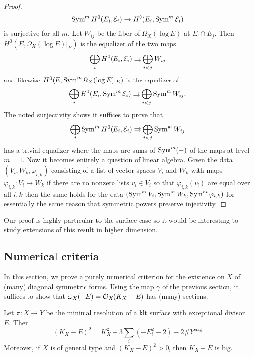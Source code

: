 \documentclass[main.tex]{subfiles}
\begin{document}
\begin{proof}
\[ \operatorname{\mathrm{Sym}}^m H^0(E_i, \mathcal{E}_i) \to H^0(E_i, \operatorname{\mathrm{Sym}}^m \mathcal{E}_i) \]
is surjective for all $m$. Let $W_{ij}$ be the fiber of $\Omega_X(\log{E})$ at $E_i \cap E_j$. Then $H^0(E, \Omega_X(\log{E})|_E)$ is the equalizer of the two maps
\[ \bigoplus_{i} H^0(E_i, \mathcal{E}_i) \rightrightarrows \bigoplus_{i < j} W_{ij} \]
and likewise $H^0(E, \operatorname{\mathrm{Sym}}^m \Omega_X(\log{E})|_E)$ is the equalizer of 
\[ \bigoplus_{i} H^0(E_i, \operatorname{\mathrm{Sym}}^m \mathcal{E}_i) \rightrightarrows \bigoplus_{i < j} \operatorname{\mathrm{Sym}}^m W_{ij}. \]
The noted surjectivity shows it suffices to prove that 
\[ \bigoplus_{i} \operatorname{\mathrm{Sym}}^m H^0(E_i, \mathcal{E}_i) \rightrightarrows \bigoplus_{i < j} \operatorname{\mathrm{Sym}}^m W_{ij} \]
has a trivial equalizer where the maps are sums of $\operatorname{\mathrm{Sym}}^m(-)$ of the maps at level $m = 1$. Now it becomes entirely a question of linear algebra. Given the data $(V_i, W_k, \varphi_{i,k})$ consisting of a list of vector spaces $V_i$ and $W_k$ with maps $\varphi_{i,k} : V_i \to W_k$ if there are no nonzero lists $v_i \in V_i$ so that $\varphi_{i,k}(v_i)$ are equal over all $i,k$ then the same holds for the data $(\operatorname{\mathrm{Sym}}^m V_i, \operatorname{\mathrm{Sym}}^m W_k, \operatorname{\mathrm{Sym}}^m \varphi_{i,k})$ for essentially the same reason that symmetric powers preserve injectivity.
\end{proof}

Our proof is highly particular to the surface case so it would be interesting to study extensions of this result in higher dimension. 

\subsection{Numerical criteria}

In this section, we prove a purely numerical criterion for the existence on $X$ of (many) diagonal symmetric forms. Using the map $\gamma$ of the previous section, it suffices to show that $\omega_X(-E) = \mathcal{O}_{X}(K_X - E)$ has (many) sections. 

\begin{prop} \label{prop:numerical_volume}
Let $\pi : X \to Y$ be the minimal resolution of a klt surface with exceptional divisor $E$. Then 
\[ (K_X - E)^2 = K_X^2 - 3 \sum_i (-E_i^2 - 2) - 2 \# Y^{\mathrm{sing}} \]
Moreover, if $X$ is of general type and $(K_X - E)^2 > 0$, then $K_X - E$ is big.
\end{prop}
\end{document}
